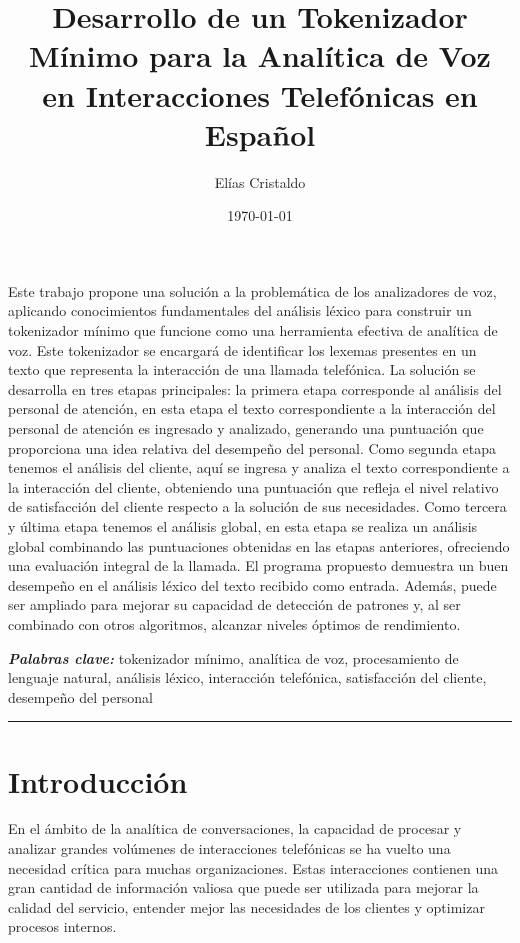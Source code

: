 \documentclass[twocolumn, fontsize=10pt]{article}
\title{
\centering
\Large Desarrollo de un Tokenizador Mínimo para la Analítica de Voz en Interacciones Telefónicas en Español\\
[10pt] 
}
\date{\today}
\author{Elías Cristaldo}
\makeatletter
\renewenvironment{abstract} %
 {\small
  \begin{center}
  \bfseries \abstractname\vspace{-.5em}\vspace{0pt}
  \end{center}
  \list{}{%
    \setlength{\leftmargin}{0mm}
    \setlength{\rightmargin}{\leftmargin}%
  }
  \item\relax}
 {\endlist}
\renewcommand{\maketitle}{\bgroup\setlength{\parindent}{0pt} %
\begin{flushleft}
  \textbf{\@title}
  \@author \\ 
  \@date
\end{flushleft}\egroup
}
\providecommand{\keywords}[1]
{
  \small	
  \textbf{\textit{Palabras clave:}} #1
}
\makeatother
\begin{document}
\twocolumn[ \maketitle ]

\begin{abstract}
Este trabajo propone una solución a la problemática de los analizadores de voz, aplicando conocimientos fundamentales del análisis léxico para construir un tokenizador mínimo que funcione como una herramienta efectiva de analítica de voz. Este tokenizador se encargará de identificar los lexemas presentes en un texto que representa la interacción de una llamada telefónica. La solución se desarrolla en tres etapas principales: la primera etapa corresponde al análisis del personal de atención, en esta etapa el texto correspondiente a la interacción del personal de atención es ingresado y analizado, generando una puntuación que proporciona una idea relativa del desempeño del personal. Como segunda etapa tenemos el análisis del cliente, aquí se ingresa y analiza el texto correspondiente a la interacción del cliente, obteniendo una puntuación que refleja el nivel relativo de satisfacción del cliente respecto a la solución de sus necesidades. Como tercera y última etapa tenemos el análisis global, en esta etapa se realiza un análisis global combinando las puntuaciones obtenidas en las etapas anteriores, ofreciendo una evaluación integral de la llamada. El programa propuesto demuestra un buen desempeño en el análisis léxico del texto recibido como entrada. Además, puede ser ampliado para mejorar su capacidad de detección de patrones y, al ser combinado con otros algoritmos, alcanzar niveles óptimos de rendimiento.
\end{abstract}

\keywords{tokenizador mínimo, analítica de voz, procesamiento de lenguaje natural, análisis léxico, interacción telefónica, satisfacción del cliente, desempeño del personal}

\rule{\linewidth}{0.5pt}

\section{Introducción}
En el ámbito de la analítica de conversaciones, la capacidad de procesar y analizar grandes volúmenes de interacciones telefónicas se ha vuelto una necesidad crítica para muchas organizaciones. Estas interacciones contienen una gran cantidad de información valiosa que puede ser utilizada para mejorar la calidad del servicio, entender mejor las necesidades de los clientes y optimizar procesos internos. 
\end{document}
